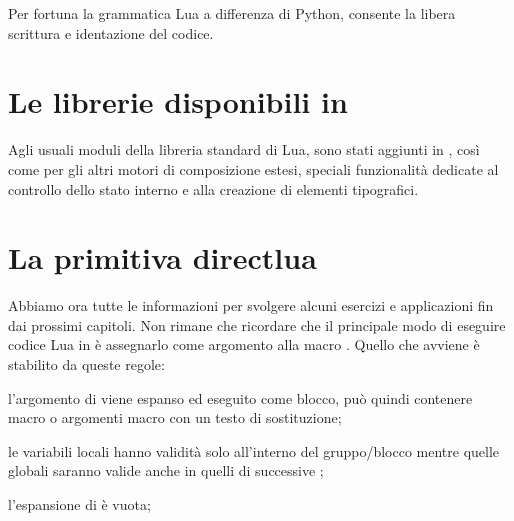 Per fortuna la grammatica Lua a differenza di Python, consente la libera
scrittura e identazione del codice.


\section{Le librerie disponibili in \LuaTeX}

Agli usuali moduli della libreria standard di Lua, sono stati aggiunti in
\LuaTeX{}, così come per gli altri motori di composizione estesi, speciali
funzionalità dedicate al controllo dello stato interno e alla creazione di
elementi tipografici.





\section{La primitiva directlua}

Abbiamo ora tutte le informazioni per svolgere alcuni esercizi e applicazioni
fin dai prossimi capitoli. Non rimane che ricordare che il principale modo di
eseguire codice Lua in \LuaTeX{} è assegnarlo come argomento alla macro
. Quello che avviene è stabilito da queste regole:
\begin{compactenumerate}
\item l'argomento di  viene espanso ed eseguito come blocco, può
quindi contenere macro o argomenti macro con un testo di sostituzione;

\item le variabili locali hanno validità solo all'interno del gruppo/blocco
mentre quelle globali saranno valide anche in quelli di successive
;

\item l'espansione di  è vuota;
\end{compactenumerate}


